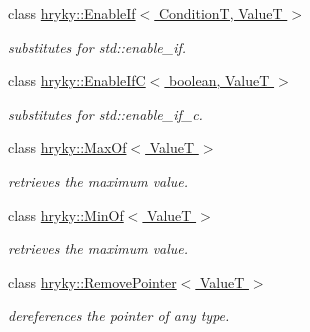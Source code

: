 \begin{DoxyCompactItemize}
class \hyperlink{classhryky_1_1_enable_if}{hryky\-::\-Enable\-If$<$ Condition\-T, Value\-T $>$}
\begin{DoxyCompactList}\small\item\em substitutes for std\-::enable\-\_\-if. \end{DoxyCompactList}\item 
class \hyperlink{classhryky_1_1_enable_if_c}{hryky\-::\-Enable\-If\-C$<$ boolean, Value\-T $>$}
\begin{DoxyCompactList}\small\item\em substitutes for std\-::enable\-\_\-if\-\_\-c. \end{DoxyCompactList}\item 
class \hyperlink{classhryky_1_1_max_of}{hryky\-::\-Max\-Of$<$ Value\-T $>$}
\begin{DoxyCompactList}\small\item\em retrieves the maximum value. \end{DoxyCompactList}\item 
class \hyperlink{classhryky_1_1_min_of}{hryky\-::\-Min\-Of$<$ Value\-T $>$}
\begin{DoxyCompactList}\small\item\em retrieves the maximum value. \end{DoxyCompactList}\item 
class \hyperlink{classhryky_1_1_remove_pointer}{hryky\-::\-Remove\-Pointer$<$ Value\-T $>$}
\begin{DoxyCompactList}\small\item\em dereferences the pointer of any type. \end{DoxyCompactList}\end{DoxyCompactItemize}
